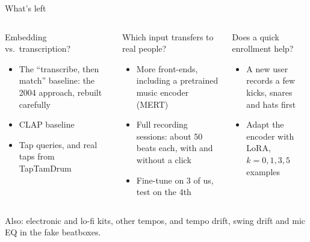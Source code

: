 \begin{frame}{What's left}

  \begin{columns}[T,onlytextwidth]
      \begin{block}{Embedding vs.\ transcription?}
        \footnotesize
        \begin{itemize}
          \item The ``transcribe, then match'' baseline: the 2004 approach, rebuilt carefully
          \item CLAP baseline
          \item Tap queries, and real taps from TapTamDrum
        \end{itemize}
      \end{block}
      \begin{block}{Which input transfers to real people?}
        \footnotesize
        \begin{itemize}
          \item More front-ends, including a pretrained music encoder (MERT)
          \item Full recording sessions: about 50 beats each, with and without a click
          \item Fine-tune on 3 of us, test on the 4th
        \end{itemize}
      \end{block}
      \begin{block}{Does a quick enrollment help?}
        \footnotesize
        \begin{itemize}
          \item A new user records a few kicks, snares and hats first
          \item Adapt the encoder with LoRA, $k = 0, 1, 3, 5$ examples
        \end{itemize}
      \end{block}
  \end{columns}

  \vspace{0.25cm}
  {\footnotesize\color{SoftGray}\raggedright
  Also: electronic and lo-fi kits, other tempos, and tempo drift, swing drift and mic EQ in the fake beatboxes.\par}

\end{frame}
